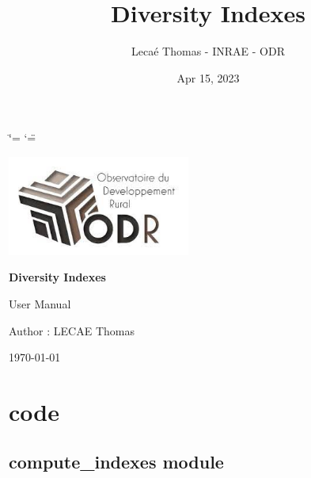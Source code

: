 \documentclass[letterpaper,10pt,english]{article}
\title{Diversity Indexes}
\date{Apr 15, 2023}
\author{Lecaé Thomas - INRAE - ODR}
\begin{document}
\ifdefined\shorthandoff
  \ifnum\catcode`\=\string=\active\shorthandoff{=}\fi
  \ifnum\catcode`\"=\active{}\fi
\fi

\pagestyle{empty}

        \begin{titlepage}
            \centering
            \includegraphics[width = 60mm]{logo.png}\\[8ex]
            \vspace{1cm}
            {\Huge\bfseries Diversity Indexes \par}
            \vspace{1cm}
            {\Large User Manual \par}
            \vspace{1cm}
            {\Large Author : LECAE Thomas\\[4ex]}
            \vfill
            {\large \today\par}
        \end{titlepage}
    
\pagestyle{plain}
\sphinxtableofcontents
\pagestyle{normal}
\label{\detokenize{index::doc}}


\sphinxstepscope


\chapter{code}
\label{\detokenize{modules:code}}\label{\detokenize{modules::doc}}
\sphinxstepscope


\section{compute\_indexes module}
\label{\detokenize{compute_indexes:module-compute_indexes}}\label{\detokenize{compute_indexes:compute-indexes-module}}\label{\detokenize{compute_indexes::doc}}
\end{document}
